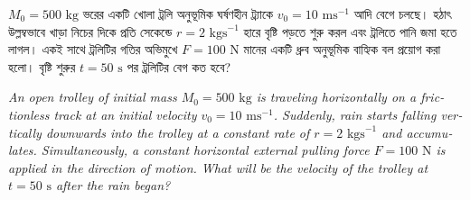 \documentclass[12pt, a4paper]{article}
\begin{document}
\newpage

\begin{tcolorbox}[questionbox={প্রশ্ন (Question) 37}]
    \noindent
    $M_0 = 500\text{ kg}$ ভরের একটি খোলা ট্রলি অনুভূমিক ঘর্ষণহীন ট্র্যাকে $v_0 = 10\text{ ms}^{-1}$ আদি বেগে চলছে। হঠাৎ উল্লম্বভাবে খাড়া নিচের দিকে প্রতি সেকেন্ডে $r = 2\text{ kgs}^{-1}$ হারে বৃষ্টি পড়তে শুরু করল এবং ট্রলিতে পানি জমা হতে লাগল। একই সাথে ট্রলিটির গতির অভিমুখে $F = 100\text{ N}$ মানের একটি ধ্রুব অনুভূমিক বাহ্যিক বল প্রয়োগ করা হলো। বৃষ্টি শুরুর $t = 50\text{ s}$ পর ট্রলিটির বেগ কত হবে?
    
    \vspace{0.8em}
    \begin{english}
    \noindent\textit{\color{darkgray}
    An open trolley of initial mass $M_0 = 500\text{ kg}$ is traveling horizontally on a frictionless track at an initial velocity $v_0 = 10\text{ ms}^{-1}$. Suddenly, rain starts falling vertically downwards into the trolley at a constant rate of $r = 2\text{ kgs}^{-1}$ and accumulates. Simultaneously, a constant horizontal external pulling force $F = 100\text{ N}$ is applied in the direction of motion. What will be the velocity of the trolley at $t = 50\text{ s}$ after the rain began?
    }
    \end{english}
\end{tcolorbox}
\end{document}
